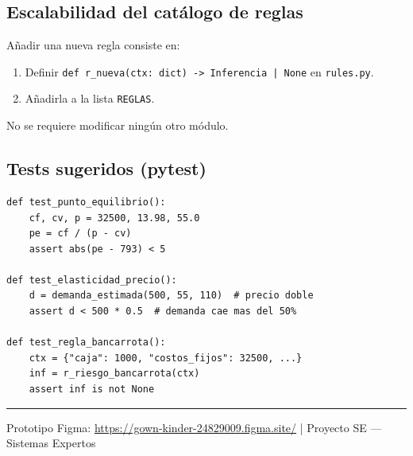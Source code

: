 \documentclass[12pt, a4paper]{article}
\begin{document}
\subsection{Escalabilidad del catálogo de reglas}

Añadir una nueva regla consiste en:
\begin{enumerate}
  \item Definir \texttt{def r\_nueva(ctx: dict) -> Inferencia | None} en \texttt{rules.py}.
  \item Añadirla a la lista \texttt{REGLAS}.
\end{enumerate}
No se requiere modificar ningún otro módulo.

\subsection{Tests sugeridos (pytest)}

\begin{lstlisting}[caption={Pruebas recomendadas para la presentación}]
def test_punto_equilibrio():
    cf, cv, p = 32500, 13.98, 55.0
    pe = cf / (p - cv)
    assert abs(pe - 793) < 5

def test_elasticidad_precio():
    d = demanda_estimada(500, 55, 110)  # precio doble
    assert d < 500 * 0.5  # demanda cae mas del 50%

def test_regla_bancarrota():
    ctx = {"caja": 1000, "costos_fijos": 32500, ...}
    inf = r_riesgo_bancarrota(ctx)
    assert inf is not None
\end{lstlisting}

\vfill
\hrule
\vspace{0.4em}
\begin{center}
  \small Prototipo Figma: \url{https://gown-kinder-24829009.figma.site/}
  \quad|\quad
  Proyecto SE — Sistemas Expertos
\end{center}
\end{document}
